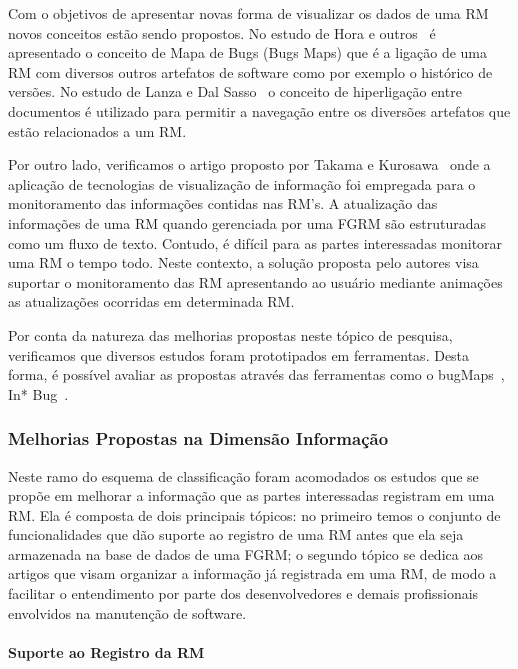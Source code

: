 Com o objetivos de apresentar novas forma de visualizar os dados de uma RM novos
conceitos estão sendo propostos. No estudo de Hora e outros~\cite{hora2012bug} é
apresentado o conceito de Mapa de Bugs (Bugs Maps) que é a ligação de uma RM com
diversos outros artefatos de software como por exemplo o histórico de versões.
No estudo de Lanza e  Dal Sasso~\cite{dal2014bug} o conceito de hiperligação
entre documentos é utilizado para permitir a navegação entre os diversões
artefatos que estão relacionados a um RM\@.

Por outro lado, verificamos o artigo proposto por Takama e
Kurosawa~\cite{takama2013application} onde a aplicação de tecnologias de
visualização de informação foi empregada para o monitoramento das informações
contidas nas RM's. A atualização das informações de uma RM quando gerenciada por
uma FGRM são estruturadas como um fluxo de texto. Contudo, é difícil para as
partes interessadas monitorar uma RM o tempo todo. Neste contexto, a solução
proposta pelo autores visa suportar o monitoramento das RM apresentando ao
usuário mediante animações as atualizações ocorridas em determinada RM\@.

Por conta da natureza das melhorias propostas neste tópico de pesquisa,
verificamos que diversos estudos foram prototipados em ferramentas. Desta forma,
é possível avaliar as propostas através das ferramentas como o
bugMaps~\cite{hora2012bug}, In* Bug~\cite{dal2014bug}.

\subsubsection{Melhorias Propostas na Dimensão Informação}
\label{ssub:melhorias_dim_informacao}

Neste ramo do esquema de classificação foram acomodados os estudos que se propõe
em melhorar a informação que as partes interessadas registram em uma RM\@. Ela é
composta de dois principais tópicos: no primeiro temos o conjunto de
funcionalidades que dão suporte ao registro de uma RM antes que ela seja
armazenada na base de dados de uma FGRM\@; o segundo tópico se dedica aos artigos
que visam organizar a informação já registrada em uma RM, de modo a facilitar o
entendimento por parte dos desenvolvedores e demais profissionais envolvidos na
manutenção de software.

\paragraph{Suporte ao Registro da RM}

